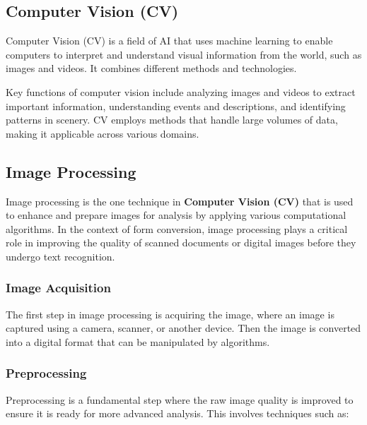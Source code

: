 \documentclass[12pt,oneside,openright,a4paper]{cpe-english-project}
\begin{document}
\subsection{Computer Vision (CV)}
Computer Vision (CV) is a field of AI that uses machine learning to enable computers to interpret and understand visual information from the world, such as images and videos. It combines different methods and technologies. \par
Key functions of computer vision include analyzing images and videos to extract important information, understanding events and descriptions, and identifying patterns in scenery. CV employs methods that handle large volumes of data, making it applicable across various domains.

\subsection{Image Processing}
Image processing is the one technique in \textbf{Computer Vision (CV)} that is used to enhance and prepare images for analysis by applying various computational algorithms. In the context of form conversion, image processing plays a critical role in improving the quality of scanned documents or digital images before they undergo text recognition.

\subsubsection{Image Acquisition} The first step in image processing is acquiring the image, where an image is captured using a camera, scanner, or another device. Then the image is converted into a digital format that can be manipulated by algorithms.

\subsubsection{Preprocessing} Preprocessing is a fundamental step where the raw image quality is improved to ensure it is ready for more advanced analysis. This involves techniques such as:
\end{document}

